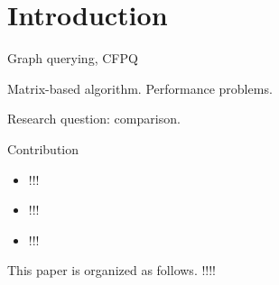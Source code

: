 \section{Introduction}

Graph querying, CFPQ

Matrix-based algorithm. Performance problems.

Research question: comparison.

Contribution
\begin{itemize}
\item !!!
\item !!!
\item !!!
\end{itemize}

This paper is organized as follows. !!!!
